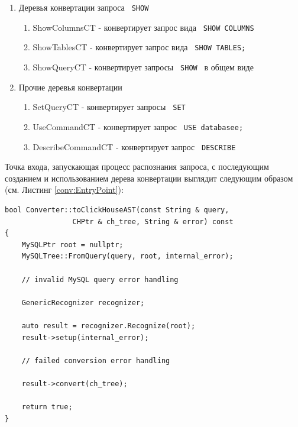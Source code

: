 \begin{enumerate}
\begin{enumerate}
    \end{enumerate}
    \item Деревья конвертации запроса \texttt{ SHOW } \begin{enumerate}
        \item ShowColumnsCT - конвертирует запрос вида \texttt{ SHOW COLUMNS } 
        \item ShowTablesCT - конвертирует запрос вида \texttt{ SHOW TABLES; } 
        \item ShowQueryCT - конвертирует запросы \texttt{ SHOW } в общем виде 
    \end{enumerate}
    \item Прочие деревья конвертации \begin{enumerate}
        \item SetQueryCT - конвертирует запросы \texttt{ SET } 
        \item UseCommandCT - конвертирует запрос \texttt{ USE databasee; } 
        \item DescribeCommandCT - конвертирует запрос \texttt{ DESCRIBE }
    \end{enumerate}
\end{enumerate}

Точка входа, запускающая процесс распознания запроса, с последующим созданием и использованием дерева конвертации выглядит следующим образом (см. Листинг \ref{conv:EntryPoint}):

\begin{code}
    \label{conv:EntryPoint}
    \begin{verbatim}
bool Converter::toClickHouseAST(const String & query, 
                CHPtr & ch_tree, String & error) const
{
    MySQLPtr root = nullptr;
    MySQLTree::FromQuery(query, root, internal_error);

    // invalid MySQL query error handling

    GenericRecognizer recognizer;
    
    auto result = recognizer.Recognize(root);
    result->setup(internal_error);

    // failed conversion error handling

    result->convert(ch_tree);

    return true;
}
    \end{verbatim}
\end{code}

